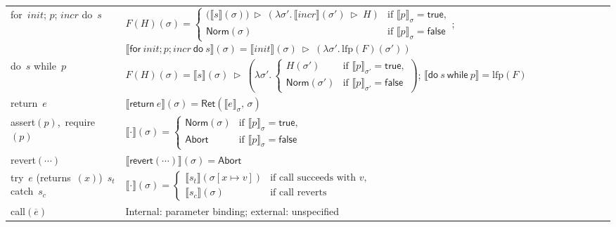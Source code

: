 \documentclass[11pt,oneside]{report}
\theoremstyle{plain}
\theoremstyle{definition}
\theoremstyle{remark}
\newcommand{\Abort}{\mathsf{Abort}}
\newcommand{\Norm}{\mathsf{Norm}}
\newcommand{\Ret}{\mathsf{Ret}}
\begin{document}
\begin{table}[t]
\begin{tabularx}{\columnwidth}{@{}p{} X@{}}
    \textsf{for}\ $init$; $p$; $incr$ \textsf{do}\ $s$ &
    $F(H)(\sigma)=
      \begin{cases}
        \big(\llbracket s\rrbracket(\sigma)\big)\ \triangleright\ (\lambda \sigma'.\,\llbracket incr\rrbracket(\sigma')\ \triangleright\ H) & \text{if }\llbracket p\rrbracket_\sigma=\mathsf{true},\\
        \Norm(\sigma) & \text{if }\llbracket p\rrbracket_\sigma=\mathsf{false}
      \end{cases}$;
    $\llbracket \textsf{for}\ init; p; incr\ \textsf{do}\ s\rrbracket(\sigma)=\llbracket init\rrbracket(\sigma)\ \triangleright\ (\lambda \sigma'.\,\mathrm{lfp}(F)(\sigma'))$\\

    \textsf{do}\ $s$ \textsf{while}\ $p$ &
    $F(H)(\sigma)=\llbracket s\rrbracket(\sigma)\ \triangleright\ (\lambda \sigma'.\,
      \begin{cases}
        H(\sigma') & \text{if }\llbracket p\rrbracket_{\sigma'}=\mathsf{true},\\
        \Norm(\sigma') & \text{if }\llbracket p\rrbracket_{\sigma'}=\mathsf{false}
      \end{cases})$;
    $\llbracket \textsf{do}\ s\ \textsf{while}\ p\rrbracket=\mathrm{lfp}(F)$\\

    \textsf{return}\ $e$ &
    $\llbracket \textsf{return}\ e\rrbracket(\sigma)=\Ret(\llbracket e\rrbracket_\sigma,\,\sigma)$\\

    \textsf{assert}$(p)$,\ \textsf{require}$(p)$ &
    $\llbracket \cdot\rrbracket(\sigma)=
      \begin{cases}
        \Norm(\sigma) & \text{if }\llbracket p\rrbracket_\sigma=\mathsf{true},\\
        \Abort & \text{if }\llbracket p\rrbracket_\sigma=\mathsf{false}
      \end{cases}$\\

    \textsf{revert}$(\cdots)$ &
    $\llbracket \textsf{revert}(\cdots)\rrbracket(\sigma)=\Abort$\\

    \textsf{try}\ $e$ (\textsf{returns}\ $(x)$)\ $s_t$ \textsf{catch}\ $s_c$ &
    $\llbracket \cdot\rrbracket(\sigma)=
      \begin{cases}
        \llbracket s_t\rrbracket(\sigma[x\mapsto v]) & \text{if call succeeds with }v,\\
        \llbracket s_c\rrbracket(\sigma) & \text{if call reverts}
      \end{cases}$\\

    \textsf{call}$(\overline{e})$ &
    Internal: parameter binding; external: unspecified\\
    \bottomrule
  \end{tabularx}
\end{table}
\end{document}
